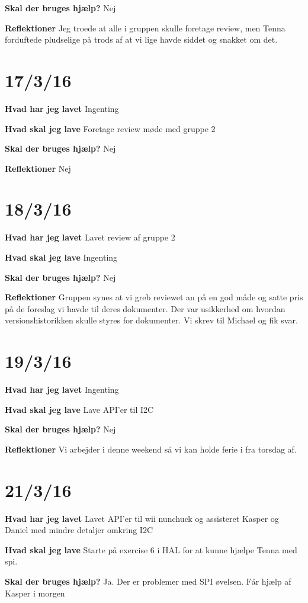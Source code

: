 \documentclass{article}
\begin{document}
	
	\textbf{Skal der bruges hjælp?}
	Nej
	
	\textbf{Reflektioner}
	Jeg troede at alle i gruppen skulle foretage review, men Tenna forduftede pludselige på trods af at vi lige havde siddet og snakket om det. 
	
	\section{17/3/16}
	\textbf{Hvad har jeg lavet}
	Ingenting
	
	\textbf{Hvad skal jeg lave}
	Foretage review møde med gruppe 2
	
	
	\textbf{Skal der bruges hjælp?}
	Nej
	
	\textbf{Reflektioner}
	Nej
	
	\section{18/3/16}
	\textbf{Hvad har jeg lavet}
	Lavet review af gruppe 2
	
	\textbf{Hvad skal jeg lave}
	Ingenting
	
	
	\textbf{Skal der bruges hjælp?}
	Nej
	
	\textbf{Reflektioner}
	Gruppen synes at vi greb reviewet an på en god måde og satte pris på de foreslag vi havde til deres dokumenter. Der var usikkerhed om hvordan versionshistorikken skulle styres for dokumenter. Vi skrev til Michael og fik svar.
	
	\section{19/3/16}
	\textbf{Hvad har jeg lavet}
	Ingenting
	
	\textbf{Hvad skal jeg lave}
	Lave API'er til I2C
	
	
	\textbf{Skal der bruges hjælp?}
	Nej
	
	\textbf{Reflektioner}
	Vi arbejder i denne weekend så vi kan holde ferie i fra torsdag af.
	
	\section{21/3/16}
	\textbf{Hvad har jeg lavet}
	Lavet API'er til wii nunchuck og assisteret Kasper og Daniel med mindre detaljer omkring I2C
	
	\textbf{Hvad skal jeg lave}
	Starte på exercise 6 i HAL for at kunne hjælpe Tenna med spi.
	
	\textbf{Skal der bruges hjælp?}
	Ja. Der er problemer med SPI øvelsen. Får hjælp af Kasper i morgen
	
\end{document}

